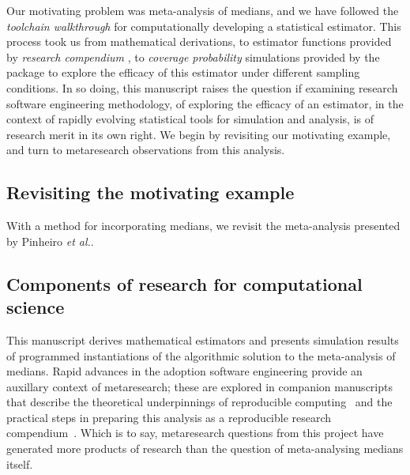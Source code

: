 \documentclass{article}
\begin{document}
Our motivating problem was meta-analysis of medians, and we have followed the \emph{toolchain walkthrough} for computationally developing a statistical estimator. This process took us from mathematical derivations, to estimator functions provided by \emph{research compendium} , to \emph{coverage probability} simulations provided by the package  to explore the efficacy of this estimator under different sampling conditions. In so doing, this manuscript raises the question if examining research software engineering methodology, of exploring the efficacy of an estimator, in the context of rapidly evolving statistical tools for simulation and analysis, is of research merit in its own right. We begin by revisiting our motivating example, and turn to metaresearch observations from this analysis.

\subsection{Revisiting the motivating example}
\label{sec: pin again}

With a method for incorporating medians, we revisit the meta-analysis presented by Pinheiro \emph{et al.}.




\subsection{Components of research for computational science}



This manuscript derives mathematical estimators and presents simulation results of programmed instantiations of the algorithmic solution to the meta-analysis of medians. Rapid advances in the adoption software engineering provide an auxillary context of metaresearch; these are explored in companion manuscripts that describe the theoretical underpinnings of reproducible computing~\cite{grayTruthProofReproducibility2019} and the practical steps in preparing this analysis as a reproducible research compendium~\cite{gray2019textttcodeproof}. Which is to say, metaresearch questions from this project have generated more products of research than the question of meta-analysing medians itself.
\end{document}
